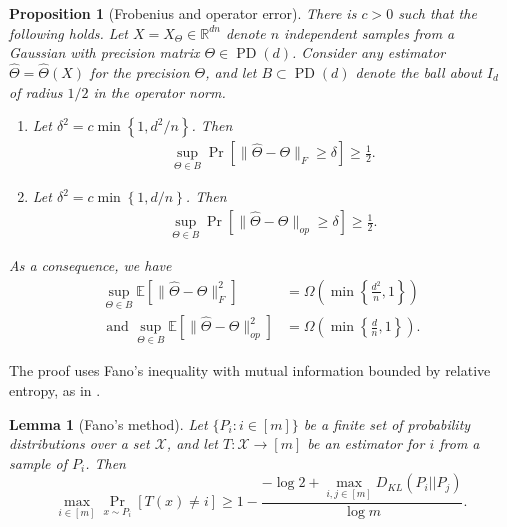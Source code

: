 \documentclass[aos]{imsart}
\newtheorem{prop}[theorem]{Proposition}
\newtheorem{lemma}[theorem]{Lemma}
\theoremstyle{definition}
\numberwithin{equation}{section}
\DeclareMathOperator{\PD}{PD}
\newcommand{\R}{{\mathbb{R}}}
\newcommand{\htheta}{\widehat{\Theta}}
\newcommand{\E}{\mathbb{E}}
\begin{document}
\begin{prop}[Frobenius and operator error]\label{prp:standard-lower}
There is $c > 0$ such that the following holds. Let $X = X_{\Theta} \in \R^{dn}$ denote $n$ independent samples from a Gaussian with precision matrix $\Theta \in \PD(d)$. Consider any estimator $\htheta = \htheta(X)$ for the precision $\Theta$, and let $B\subset \PD(d)$ denote the ball about $I_d$ of radius $1/2$ in the operator norm.
\begin{enumerate}
\item Let $\delta^2 = c\min \left\{1,d^2/n\right\}$. Then
\begin{align}
\sup_{\Theta \in B} \Pr\left[ \| \htheta - \Theta\|_F \geq \delta\right] \geq \frac{1}{2}.\label{eq:frob-lower}
\end{align}
\item Let $\delta^2 = c\min \left\{1,d/n\right\}$. Then
 \begin{align}
\sup_{\Theta \in B} \Pr\left[ \| \htheta - \Theta\|_{op} \geq \delta\right] \geq \frac{1}{2}. \label{eq:op-lower}
\end{align}
\end{enumerate}
As a consequence, we have 
\begin{align*}\sup_{\Theta \in B}\E[\| \htheta - \Theta\|_F^2] &=\Omega\left( \min \left\{\frac{d^2}{n},1\right\}\right)\\
\text{ and } \sup_{\Theta \in B}\E[\| \htheta - \Theta\|_{op}^2] &= \Omega\left( \min \left\{\frac{d}{n},1\right\}\right).\end{align*}
\end{prop}
The proof uses Fano's inequality with mutual information bounded by relative entropy, as in \cite{yang1999information}.
\begin{lemma}[Fano's method]
Let $\{P_i: i \in [m]\}$ be a finite set of probability distributions over a set $\mathcal X$, and let $T: \mathcal X \to [m]$ be an estimator for $i$ from a sample of $P_i$. Then 
$$ \max_{i\in [m]} \Pr_{x \sim P_i}[T(x) \neq i] \geq 1 - \frac{ - \log 2 + \max_{i,j \in [m]} D_{KL}(P_i|| P_j)}{\log m}.$$
\end{lemma}
\end{document}

